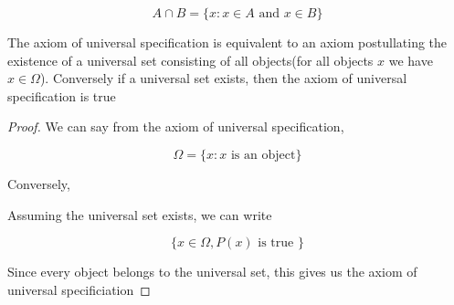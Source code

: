 \documentclass[11pt]{report}
\begin{document}
\begin{definition}
	$$A \cap B = \{x: x \in A \text{ and } x \in B \}$$
\end{definition}

\begin{prop}
	The axiom of universal specification is equivalent to an axiom postullating the existence of a universal set consisting of all objects(for all objects $x$ we have $x \in \Omega$). Conversely if a universal set exists, then the axiom of universal specification is true
\end{prop}
\begin{proof}
	We can say from the axiom of universal specification,

	\[
		\Omega = \{ x : x \text{ is an object}\}
	\]

	Conversely,

	Assuming the universal set exists, we can write

	\[
		\{x \in \Omega, P(x) \text{ is true }\}
	\]

	Since every object belongs to the universal set, this gives us the axiom of universal specificiation
\end{proof}
\end{document}
